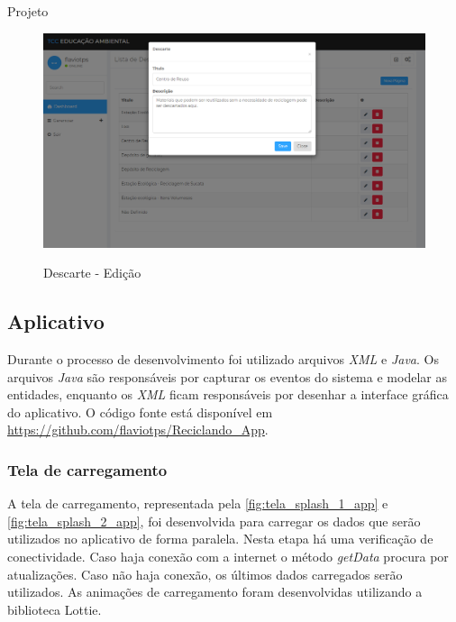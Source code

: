 \documentclass[
	12pt,				%
	openany,			%
	twoside,			%
	a4paper,			%
	english,			%
	french,				%
	spanish,			%
	brazil				%
	]{abntex2}
\begin{document}
\begin{chapter}{Projeto}
\begin{figure}[h]
\centering
   \caption{Descarte - Edição}
   \includegraphics[scale=0.40]{media/tela_descarte_site_2.png}
     \label{fig:tela_descarte_site_2}
\end{figure}
\newpage
\subsection{Aplicativo}
Durante o processo de desenvolvimento foi utilizado arquivos \textit{XML} e \textit{Java}. Os arquivos \textit{Java} são responsáveis por capturar os eventos do sistema e modelar as entidades, enquanto os \textit{XML} ficam responsáveis por desenhar a interface gráfica do aplicativo. O código fonte está disponível em \url{https://github.com/flaviotps/Reciclando_App}.

\subsubsection{Tela de carregamento} \label{splash_activity}
A tela de carregamento, representada pela \autoref{fig:tela_splash_1_app} e \autoref{fig:tela_splash_2_app}, foi desenvolvida para carregar os dados que serão utilizados no aplicativo de forma paralela. Nesta etapa há uma verificação de conectividade. Caso haja conexão com a internet o método \textit{getData} procura por atualizações. Caso não haja conexão, os últimos dados carregados serão utilizados.
As animações de carregamento foram desenvolvidas utilizando a biblioteca Lottie.




\end{chapter}
\end{document}
